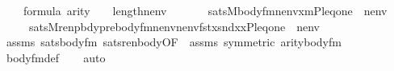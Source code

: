 \begin{isabellebody}
\ \ \ \ {\isachardoublequoteopen}{\isasymphi}{\isasymin}formula{\isachardoublequoteclose}\ {\isachardoublequoteopen}arity{\isacharparenleft}{\kern0pt}{\isasymphi}{\isacharparenright}{\kern0pt}\ {\isasymle}\ {}\ {\isacharhash}{\kern0pt}{\isacharplus}{\kern0pt}\ length{\isacharparenleft}{\kern0pt}nenv{\isacharparenright}{\kern0pt}{\isachardoublequoteclose}\isanewline
\ \ \isanewline
\ \ \ \ {\isachardoublequoteopen}sats{\isacharparenleft}{\kern0pt}M{\isacharcomma}{\kern0pt}body{\isacharunderscore}{\kern0pt}fm{\isacharparenleft}{\kern0pt}{\isasymphi}{\isacharcomma}{\kern0pt}nenv{\isacharparenright}{\kern0pt}{\isacharcomma}{\kern0pt}{\isacharbrackleft}{\kern0pt}{\isasymalpha}{\isacharcomma}{\kern0pt}x{\isacharcomma}{\kern0pt}m{\isacharcomma}{\kern0pt}P{\isacharcomma}{\kern0pt}leq{\isacharcomma}{\kern0pt}one{\isacharbrackright}{\kern0pt}\ {\isacharat}{\kern0pt}\ nenv{\isacharparenright}{\kern0pt}\ {\isasymlongleftrightarrow}\isanewline
\ \ \ \ \ sats{\isacharparenleft}{\kern0pt}M{\isacharcomma}{\kern0pt}renpbdy{\isacharparenleft}{\kern0pt}prebody{\isacharunderscore}{\kern0pt}fm{\isacharparenleft}{\kern0pt}{\isasymphi}{\isacharcomma}{\kern0pt}nenv{\isacharparenright}{\kern0pt}{\isacharcomma}{\kern0pt}nenv{\isacharparenright}{\kern0pt}{\isacharcomma}{\kern0pt}{\isacharbrackleft}{\kern0pt}fst{\isacharparenleft}{\kern0pt}x{\isacharparenright}{\kern0pt}{\isacharcomma}{\kern0pt}snd{\isacharparenleft}{\kern0pt}x{\isacharparenright}{\kern0pt}{\isacharcomma}{\kern0pt}x{\isacharcomma}{\kern0pt}{\isasymalpha}{\isacharcomma}{\kern0pt}P{\isacharcomma}{\kern0pt}leq{\isacharcomma}{\kern0pt}one{\isacharbrackright}{\kern0pt}\ {\isacharat}{\kern0pt}\ nenv{\isacharparenright}{\kern0pt}{\isachardoublequoteclose}\isanewline
%
\isadelimproof
\ \ %
\endisadelimproof
%
\isatagproof
{}\isamarkupfalse%
\ assms\ sats{\isacharunderscore}{\kern0pt}body{\isacharunderscore}{\kern0pt}fm{\isacharprime}{\kern0pt}\ sats{\isacharunderscore}{\kern0pt}renbody{\isacharbrackleft}{\kern0pt}OF\ {\isacharunderscore}{\kern0pt}\ assms{\isacharparenleft}{\kern0pt}{}{\isacharparenright}{\kern0pt}{\isacharcomma}{\kern0pt}\ symmetric{\isacharbrackright}{\kern0pt}\ arity{\isacharunderscore}{\kern0pt}body{\isacharunderscore}{\kern0pt}fm{\isacharprime}{\kern0pt}\isanewline
\ \ \isamarkupfalse%
\ body{\isacharunderscore}{\kern0pt}fm{\isacharunderscore}{\kern0pt}def\isanewline
\ \ \isamarkupfalse%
\ auto%
\endisatagproof
{\isafoldproof}%
%
\isadelimproof
\isanewline
%
\endisadelimproof
\isanewline
{}\isamarkupfalse%

\end{isabellebody}
